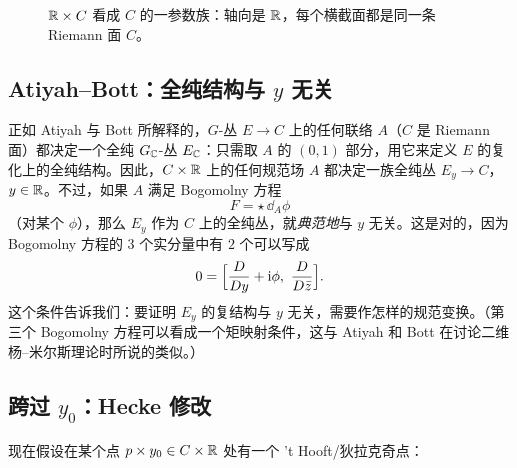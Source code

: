 \begin{figure}[htbp]
\centering
{}
\caption{$\mathbb{R}\times C$ 看成 $C$ 的一参数族：轴向是 $\mathbb{R}$，每个横截面都是同一条 Riemann 面 $C$。}
\label{fig:cylinder}
\end{figure}

\subsection{Atiyah--Bott：全纯结构与 $y$ 无关}

正如 Atiyah 与 Bott 所解释的，$G$-丛 $E\to C$ 上的任何联络 $A$（$C$ 是 Riemann 面）都决定一个全纯 $G_{\mathbb{C}}$-丛 $E_{\mathbb{C}}$：只需取 $A$ 的 $(0,1)$ 部分，用它来定义 $E$ 的复化上的全纯结构。因此，$C\times\mathbb{R}$ 上的任何规范场 $A$ 都决定一族全纯丛 $E_y\to C$，$y\in\mathbb{R}$。不过，如果 $A$ 满足 Bogomolny 方程
\[
  F=\star\,\dd_A\phi
\]
（对某个 $\phi$），那么 $E_y$ 作为 $C$ 上的全纯丛，就\emph{典范地}与 $y$ 无关。这是对的，因为 Bogomolny 方程的 $3$ 个实分量中有 $2$ 个可以写成
\begin{equation}
  0=\Bigl[\frac{D}{Dy}+\ii\phi,\ \frac{D}{D\bar z}\Bigr].
  \label{eq:indep}
\end{equation}
这个条件告诉我们：要证明 $E_y$ 的复结构与 $y$ 无关，需要作怎样的规范变换。（第三个 Bogomolny 方程可以看成一个矩映射条件，这与 Atiyah 和 Bott 在讨论二维杨--米尔斯理论时所说的类似。）

\subsection{跨过 $y_0$：Hecke 修改}

现在假设在某个点 $p\times y_0\in C\times\mathbb{R}$ 处有一个 't Hooft/狄拉克奇点：

